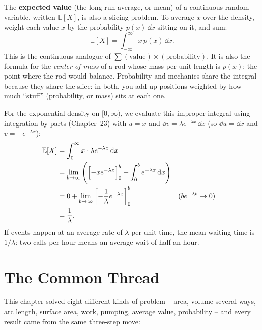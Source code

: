 \begin{applicationbox}
The \textbf{expected value} (the long-run average, or mean) of a continuous random
variable, written $\mathbb{E}[X]$, is
also a slicing problem. To average $x$ over the density, weight each value $x$ by the
probability $p(x)\,\dd x$ sitting on it, and sum:
\[
  \mathbb{E}[X] = \int_{-\infty}^{\infty} x\,p(x)\,\dd x.
\]
This is the continuous analogue of $\sum (\text{value})\times(\text{probability})$.
It is also the formula for the \emph{center of mass} of a rod whose
mass per unit length is $p(x)$: the point where the rod would balance. Probability
and mechanics share the integral because they share the slice: in both, you add up
positions weighted by how much ``stuff'' (probability, or mass) sits at each one.

For the exponential density on $[0,\infty)$, we evaluate this improper integral
using integration by parts (Chapter~23) with $u = x$ and $\dd v = \lambda e^{-\lambda x}\,\dd x$
(so $\dd u = \dd x$ and $v = -e^{-\lambda x}$):
\begin{align*}
  \mathbb{E}[X] &= \int_0^{\infty} x\cdot \lambda e^{-\lambda x}\,\mathrm{d} x\\
  &= \lim_{b\to\infty}\left( \Bigl[-x e^{-\lambda x}\Bigr]_0^b + \int_0^b e^{-\lambda x}\,\mathrm{d} x \right)\\
  &= 0 + \lim_{b\to\infty}\left[ -\frac{1}{\lambda}e^{-\lambda x} \right]_0^b
   && \text{($b e^{-\lambda b}\to 0$)}\\
  &= \frac{1}{\lambda}.
\end{align*}
If events happen at an average rate of $\lambda$ per unit time, the mean waiting
time is $1/\lambda$: two calls per hour means an average wait of half an hour.
\end{applicationbox}

\section{The Common Thread}
\label{ch26:thread}

This chapter solved eight different kinds of problem --
area, volume several ways, arc length, surface area, work, pumping, average value,
probability -- and every result came from the same three-step move:

